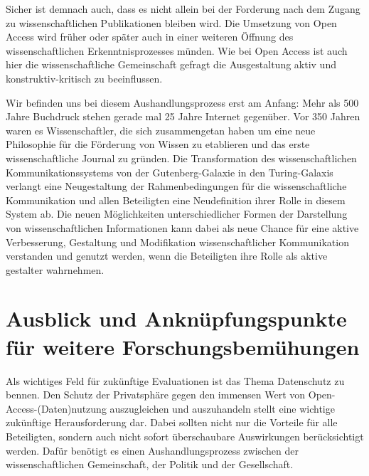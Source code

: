 Sicher ist demnach auch, dass es nicht allein bei der Forderung nach dem Zugang zu wissenschaftlichen Publikationen bleiben wird. Die Umsetzung von Open Access wird früher oder später auch in einer weiteren Öffnung des wissenschaftlichen Erkenntnisprozesses münden. Wie bei Open Access ist auch hier die wissenschaftliche Gemeinschaft gefragt die Ausgestaltung aktiv und konstruktiv-kritisch zu beeinflussen.

Wir befinden uns bei diesem Aushandlungsprozess erst am Anfang: Mehr als 500 Jahre Buchdruck stehen gerade mal 25 Jahre Internet gegenüber. Vor 350 Jahren waren es Wissenschaftler, die sich zusammengetan haben um eine neue Philosophie für die Förderung von Wissen zu etablieren und das erste wissenschaftliche Journal zu gründen. Die Transformation des wissenschaftlichen Kommunikationssystems von der Gutenberg-Galaxie in den Turing-Galaxis verlangt eine Neugestaltung der Rahmenbedingungen für die wissenschaftliche Kommunikation und allen Beteiligten eine Neudefinition ihrer Rolle in diesem System ab. Die neuen Möglichkeiten unterschiedlicher Formen der Darstellung von wissenschaftlichen Informationen kann dabei als neue Chance für eine aktive Verbesserung, Gestaltung und Modifikation wissenschaftlicher Kommunikation verstanden und genutzt werden, wenn die Beteiligten ihre Rolle als aktive gestalter wahrnehmen.

\section{Ausblick und Anknüpfungspunkte für weitere Forschungsbemühungen}

Als wichtiges Feld für zukünftige Evaluationen ist das Thema Datenschutz zu bennen. Den Schutz der Privatsphäre gegen den immensen Wert von Open-Access-(Daten)nutzung auszugleichen und auszuhandeln stellt eine wichtige zukünftige Herausforderung dar. Dabei sollten nicht nur die Vorteile für alle Beteiligten, sondern auch nicht sofort überschaubare Auswirkungen berücksichtigt werden. Dafür benötigt es einen Aushandlungsprozess zwischen der wissenschaftlichen Gemeinschaft, der Politik und der Gesellschaft.

